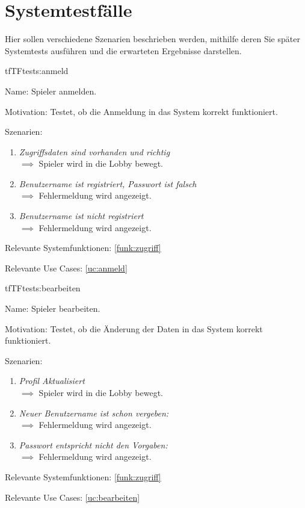 \chapter{Systemtestfälle}

Hier sollen verschiedene Szenarien beschrieben werden, mithilfe deren Sie später Systemtests ausführen und die erwarteten Ergebnisse darstellen.

\setcounter{tf}{10}

\begin{description}[leftmargin=5em, style=sameline]

\begin{lhp}{tf}{TF}{tests:anmeld}
	\item [Name:] Spieler anmelden.
	\item [Motivation:] Testet, ob die Anmeldung in das System korrekt funktioniert.
	\item [Szenarien:] \hfill
		\begin{enumerate}
			\item \textit{Zugriffsdaten sind vorhanden und richtig} \\ $\implies$ Spieler wird in die Lobby bewegt.
			\item \textit{Benutzername ist registriert, Passwort ist falsch} \\ $\implies$ Fehlermeldung wird angezeigt.
			\item \textit{Benutzername ist nicht registriert} \\ $\implies$ Fehlermeldung wird angezeigt.
		\end{enumerate}
	\item [Relevante Systemfunktionen:] \ref{funk:zugriff}
	\item [Relevante Use Cases:] \ref{uc:anmeld}
\end{lhp}

\begin{lhp}{tf}{TF}{tests:bearbeiten}
	\item [Name:] Spieler bearbeiten.
	\item [Motivation:] Testet, ob die Änderung der Daten in das System korrekt funktioniert.
	\item [Szenarien:] \hfill
		\begin{enumerate}
			\item \textit{Profil Aktualisiert} \\ $\implies$ Spieler wird in die Lobby bewegt.
			\item \textit{Neuer Benutzername ist schon vergeben:} \\ $\implies$ Fehlermeldung wird angezeigt.
			\item \textit{Passwort entspricht nicht den Vorgaben:} \\ $\implies$ Fehlermeldung wird angezeigt.
		\end{enumerate}
	\item [Relevante Systemfunktionen:] \ref{funk:zugriff}
	\item [Relevante Use Cases:] \ref{uc:bearbeiten}
\end{lhp}


\end{description}
